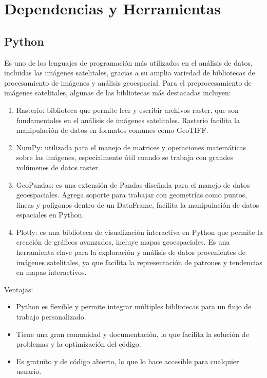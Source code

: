 \section{Dependencias y Herramientas}

\subsection{Python}
Es uno de los lenguajes de programación más utilizados en el análisis de datos, incluidas las 
imágenes satelitales, gracias a su amplia variedad de bibliotecas de procesamiento de imágenes y análisis
geoespacial. Para el preprocesamiento de imágenes satelitales, algunas de las bibliotecas más destacadas 
incluyen:

\begin{enumerate}
	\item Rasterio: biblioteca que permite leer y escribir archivos raster, que son fundamentales en el 
	análisis de imágenes satelitales. Rasterio facilita la manipulación de datos en formatos comunes como
	GeoTIFF.
	\item NumPy: utilizada para el manejo de matrices y operaciones matemáticas sobre las imágenes, especialmente
	útil cuando se trabaja con grandes volúmenes de datos raster.  
	\item GeoPandas: es una extensión de Pandas diseñada para el manejo de datos geoespaciales. Agrega soporte 
	para trabajar con geometrías como puntos, líneas y polígonos dentro de un DataFrame, facilita la
	manipulación de datos espaciales en Python.
	\item Plotly: es una biblioteca de visualización interactiva en Python que permite la creación de gráficos
	 avanzados, incluye mapas geoespaciales. Es una herramienta clave para la exploración y análisis de 
	 datos provenientes de imágenes satelitales, ya que facilita la representación de patrones y
	tendencias en mapas interactivos.
	\end{enumerate}

Ventajas:

\begin{itemize}
	\item Python es flexible y permite integrar múltiples bibliotecas para un flujo de trabajo personalizado.
	\item Tiene una gran comunidad y documentación, lo que facilita la solución de problemas y la optimización del código.
	\item Es gratuito y de código abierto, lo que lo hace accesible para cualquier usuario. 
\end{itemize}

